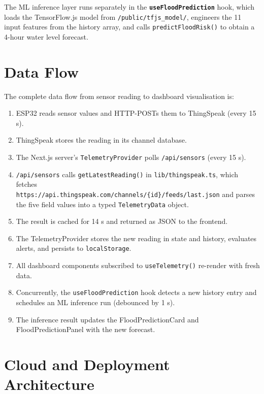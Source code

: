 The ML inference layer runs separately in the \textbf{\texttt{useFloodPrediction}} hook, which loads the TensorFlow.js model from \texttt{/\allowbreak{}public/\allowbreak{}tfjs\_\allowbreak{}model/\allowbreak{}}, engineers the 11 input features from the history array, and calls \texttt{predictFloodRisk()} to obtain a 4-hour water level forecast.

\section{Data Flow}

The complete data flow from sensor reading to dashboard visualisation is:

\begin{enumerate}[leftmargin=1.5em]
  \item ESP32 reads sensor values and HTTP-POSTs them to ThingSpeak (every 15 s).
  \item ThingSpeak stores the reading in its channel database.
  \item The Next.js server's \texttt{TelemetryProvider} polls \texttt{/\allowbreak{}api/\allowbreak{}sensors} (every 15 s).
  \item \texttt{/\allowbreak{}api/\allowbreak{}sensors} calls \texttt{getLatestReading()} in \texttt{lib/\allowbreak{}thingspeak.\allowbreak{}ts}, which fetches \\ \texttt{https:/\allowbreak{}/\allowbreak{}api.\allowbreak{}thingspeak.\allowbreak{}com/\allowbreak{}channels/\allowbreak{}\{id\}/feeds/last.json} and parses the five field values into a typed \texttt{TelemetryData} object.
  \item The result is cached for 14 s and returned as JSON to the frontend.
  \item The TelemetryProvider stores the new reading in state and history, evaluates alerts, and persists to \texttt{localStorage}.
  \item All dashboard components subscribed to \texttt{useTelemetry()} re-render with fresh data.
  \item Concurrently, the \texttt{useFloodPrediction} hook detects a new history entry and schedules an ML inference run (debounced by 1 s).
  \item The inference result updates the FloodPredictionCard and FloodPredictionPanel with the new forecast.
\end{enumerate}

\section{Cloud and Deployment Architecture}

